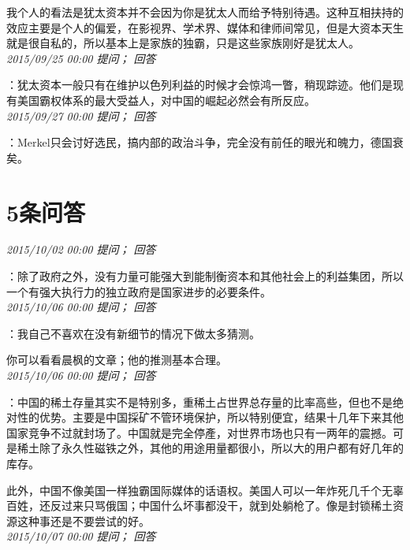 \documentclass[twocolumn]{ctexart}
\begin{document}
我个人的看法是犹太资本并不会因为你是犹太人而给予特别待遇。这种互相扶持的效应主要是个人的偏爱，在影视界、学术界、媒体和律师间常见，但是大资本天生就是很自私的，所以基本上是家族的独霸，只是这些家族刚好是犹太人。\\

\textit{\hfill\noindent\small 2015/09/25 00:00 提问； 回答}

：犹太资本一般只有在维护以色列利益的时候才会惊鸿一瞥，稍现踪迹。他们是现有美国霸权体系的最大受益人，对中国的崛起必然会有所反应。\\

\textit{\hfill\noindent\small 2015/09/27 00:00 提问； 回答}

：Merkel只会讨好选民，搞内部的政治斗争，完全没有前任的眼光和魄力，德国衰矣。\\

\section{5条问答}

\textit{\hfill\noindent\small 2015/10/02 00:00 提问； 回答}

：除了政府之外，没有力量可能强大到能制衡资本和其他社会上的利益集团，所以一个有强大执行力的独立政府是国家进步的必要条件。\\

\textit{\hfill\noindent\small 2015/10/06 00:00 提问； 回答}

：我自己不喜欢在没有新细节的情况下做太多猜测。

你可以看看晨枫的文章；他的推测基本合理。\\

\textit{\hfill\noindent\small 2015/10/06 00:00 提问； 回答}

：中国的稀土存量其实不是特别多，重稀土占世界总存量的比率高些，但也不是绝对性的优势。主要是中国採矿不管环境保护，所以特别便宜，结果十几年下来其他国家竞争不过就封场了。中国就是完全停產，对世界市场也只有一两年的震撼。可是稀土除了永久性磁铁之外，其他的用途用量都很小，所以大的用户都有好几年的库存。

此外，中国不像美国一样独霸国际媒体的话语权。美国人可以一年炸死几千个无辜百姓，还反过来只骂俄国；中国什么坏事都没干，就到处躺枪了。像是封锁稀土资源这种事还是不要尝试的好。\\

\textit{\hfill\noindent\small 2015/10/07 00:00 提问； 回答}
\end{document}
